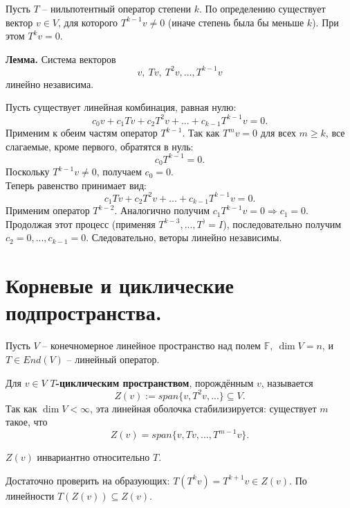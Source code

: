 \documentclass[14pt]{extreport}
\begin{document}
    \begin{thbox}
        Пусть $T$ – нильпотентный оператор степени $k$. По определению существует вектор $v \in V$, для которого $T^{k-1}v \neq 0$ (иначе степень была бы меньше $k$). При этом $T^kv = 0$.

        \textbf{Лемма.} Система векторов
        \[
        v,\ Tv,\ T^2v, ..., T^{k-1}v
        \]
        линейно независима.
    \end{thbox}
    \begin{prbox}
        Пусть существует линейная комбинация, равная нулю:
        \[
        c_0v + c_1Tv + c_2T^2v + ... + c_{k-1}T^{k-1}v = 0.
        \]
        Применим к обеим частям оператор $T^{k-1}$. Так как $T^mv = 0$ для всех $m \geq k$, все слагаемые, кроме первого, обратятся в нуль:
        \[
        c_0T^{k-1} = 0.
        \]
        Поскольку $T^{k-1}v \neq 0$, получаем $c_0 = 0$.\\
        Теперь равенство принимает вид:
        \[
        c_1Tv + c_2T^2v + ... + c_{k-1}T^{k-1}v = 0.
        \]
        Применим оператор $T^{k-2}$. Аналогично получим $c_1T^{k-1}v=0 \Rightarrow c_1 = 0$. Продолжая этот процесс (применяя $T^{k-3}, ..., T^)=I$), последовательно получим $c_2=0, ..., c_{k-1}=0$. Следовательно, веторы линейно независимы.
    \end{prbox}



    \chapter{Корневые и циклические подпространства.}

    \begin{defbox}
        Пусть $V$ – конечномерное линейное пространство над полем $\mathbb{F},\ \dim V = n$, и $T \in End(V)$ – линейный оператор.

        Для $v \in V$ \textbf{$T$-циклическим пространством}, порождённым $v$, называется
        \[
        Z(v) := span \{ v,T^2v,... \} \subseteq V.
        \]
        Так как $\dim V < \infty$, эта линейная оболочка стабилизируется: существует $m$ такое, что
        \[
        Z(v) = span \{ v,Tv,...,T^{m-1}v \}.
        \]
    \end{defbox}

    \begin{thbox}
        $Z(v)$ инвариантно относительно $T$.
    \end{thbox}
    \begin{prbox}
        Достаточно проверить на образующих: $T(T^kv) = T^{k+1}v \in Z(v)$. По линейности $T(Z(v)) \subseteq Z(v)$.
    \end{prbox}
\end{document}
